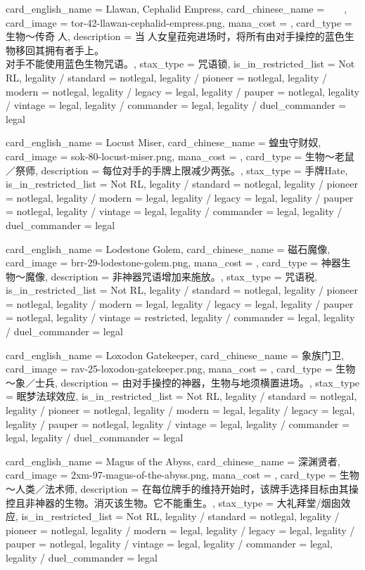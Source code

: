 \documentclass[lang = cn, color = black, 10pt]{AllThatStax}
\begin{document}
\card
{
	card_english_name = {Llawan, Cephalid Empress},
	card_chinese_name = {𫠒人女皇菈宛},
	card_image = tor-42-llawan-cephalid-empress.png,
	mana_cost = ,
	card_type = 生物～传奇𫠒人,
	description = {当𫠒人女皇菈宛进场时，将所有由对手操控的蓝色生物移回其拥有者手上。\\
对手不能使用蓝色生物咒语。},
	stax_type = 咒语锁,
	is_in_restricted_list = Not RL,
	legality / standard = notlegal,
	legality / pioneer = notlegal,
	legality / modern = notlegal,
	legality / legacy = legal,
	legality / pauper = notlegal,
	legality / vintage = legal,
	legality / commander = legal,
	legality / duel_commander = legal
}

\card
{
	card_english_name = {Locust Miser},
	card_chinese_name = {蝗虫守财奴},
	card_image = sok-80-locust-miser.png,
	mana_cost = ,
	card_type = 生物～老鼠／祭师,
	description = {每位对手的手牌上限减少两张。},
	stax_type = 手牌Hate,
	is_in_restricted_list = Not RL,
	legality / standard = notlegal,
	legality / pioneer = notlegal,
	legality / modern = legal,
	legality / legacy = legal,
	legality / pauper = notlegal,
	legality / vintage = legal,
	legality / commander = legal,
	legality / duel_commander = legal
}

\card
{
	card_english_name = {Lodestone Golem},
	card_chinese_name = {磁石魔像},
	card_image = brr-29-lodestone-golem.png,
	mana_cost = ,
	card_type = 神器生物～魔像,
	description = {非神器咒语增加来施放。},
	stax_type = 咒语税,
	is_in_restricted_list = Not RL,
	legality / standard = notlegal,
	legality / pioneer = notlegal,
	legality / modern = legal,
	legality / legacy = legal,
	legality / pauper = notlegal,
	legality / vintage = restricted,
	legality / commander = legal,
	legality / duel_commander = legal
}

\card
{
	card_english_name = {Loxodon Gatekeeper},
	card_chinese_name = {象族门卫},
	card_image = rav-25-loxodon-gatekeeper.png,
	mana_cost = ,
	card_type = 生物～象／士兵,
	description = {由对手操控的神器，生物与地须横置进场。},
	stax_type = 眠梦法球效应,
	is_in_restricted_list = Not RL,
	legality / standard = notlegal,
	legality / pioneer = notlegal,
	legality / modern = legal,
	legality / legacy = legal,
	legality / pauper = notlegal,
	legality / vintage = legal,
	legality / commander = legal,
	legality / duel_commander = legal
}

\card
{
	card_english_name = {Magus of the Abyss},
	card_chinese_name = {深渊贤者},
	card_image = 2xm-97-magus-of-the-abyss.png,
	mana_cost = ,
	card_type = 生物 ～人类／法术师,
	description = {在每位牌手的维持开始时，该牌手选择目标由其操控且非神器的生物。消灭该生物。它不能重生。},
	stax_type = 大礼拜堂/烟囱效应,
	is_in_restricted_list = Not RL,
	legality / standard = notlegal,
	legality / pioneer = notlegal,
	legality / modern = legal,
	legality / legacy = legal,
	legality / pauper = notlegal,
	legality / vintage = legal,
	legality / commander = legal,
	legality / duel_commander = legal
}
\end{document}
